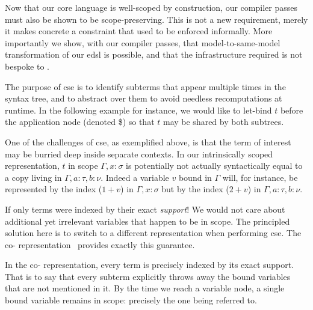 
Now that our core language is well-scoped by construction, our compiler passes must also be shown to be scope-preserving.
%
This is not a new requirement, merely it makes concrete a constraint that used to be enforced informally.
%
More importantly we show, with our compiler passes, that model-to-same-model transformation of our \ac{edsl} is possible, and that the infrastructure required is not bespoke to \Velo{}.

The purpose of \ac{cse} is to identify subterms that appear multiple times in the syntax tree, and to abstract over them to avoid needless recomputations at runtime.
%
In the following example for instance, we would like to let-bind $t$ before the application node (denoted \$) so that $t$ may be shared by both subtrees.

\begin{center}
  \cseexamplegraph{}
\end{center}

One of the challenges of \ac{cse}, as exemplified above, is that the term of interest may be burried deep inside separate contexts.
%
In our intrinsically scoped representation, $t$ in scope $\Gamma, x : \sigma$ is potentially not actually syntactically equal to a copy living in $\Gamma, a : \tau, b : \nu$.
%
Indeed a variable $v$ bound in $\Gamma$ will, for instance, be represented by the \DeBruijn{} index ($1+v$) in $\Gamma, x : \sigma$ but by the index ($2+v$) in $\Gamma, a :  \tau, b : \nu$.

If only terms were indexed by their exact \emph{support}!
%
We would not care about additional yet irrelevant variables that happen to be in scope.
%
The principled solution here is to switch to a different representation when performing \ac{cse}.
%
The co-\DeBruijn{} representation~\cite{DBLP:journals/corr/abs-1807-04085} provides exactly this guarantee.


In the co-\DeBruijn{} representation, every term is precisely indexed by its exact support.
%
That is to say that every subterm explicitly throws away the bound variables that are not mentioned in it.
%
By the time we reach a variable node, a single bound variable remains in scope:
%
precisely the one being referred to.

